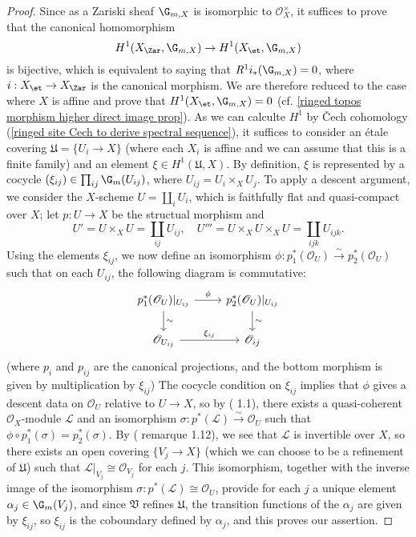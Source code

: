 \begin{proof}
Since as a Zariski sheaf $\G_{m,X}$ is isomorphic to $\mathscr{O}_X^\times$, it suffices to prove that the canonical homomorphism
\[H^1(X_\Zar,\G_{m,X})\to H^1(X_\et,\G_{m,X})\]
is bijective, which is equivalent to saying that $R^1i_*(\G_{m,X})=0$, where $i:X_\et\to X_\Zar$ is the canonical morphism. We are therefore reduced to the case where $X$ is affine and prove that $H^1(X_\et,\G_{m,X})=0$ (cf. \cref{ringed topos morphism higher direct image prop}). As we can calculte $H^1$ by \v{C}ech cohomology (\cref{ringed site Cech to derive spectral sequence}), it suffices to consider an \'etale covering $\mathfrak{U}=\{U_i\to X\}$ (where each $X_i$ is affine and we can assume that this is a finite family) and an element $\xi\in H^1(\mathfrak{U},X)$. By definition, $\xi$ is represented by a cocycle $(\xi_{ij})\in\prod_{ij}\G_m(U_{ij})$, where $U_{ij}=U_i\times_XU_j$. To apply a descent argument, we consider the $X$-scheme $U=\coprod_iU_i$, which is faithfully flat and quasi-compact over $X$; let $p:U\to X$ be the structual morphism and
\[U'=U\times_XU=\coprod_{ij}U_{ij},\quad U'''=U\times_XU\times_XU=\coprod_{ijk}U_{ijk}.\]
Using the elements $\xi_{ij}$, we now define an isomorphism $\phi:p_1^*(\mathscr{O}_U)\stackrel{\sim}{\to}p_2^*(\mathscr{O}_U)$ such that on each $U_{ij}$, the following diagram is commutative:
\[\begin{tikzcd}
p_1^*(\mathscr{O}_U)|_{U_{ij}}\ar[r,"\phi"]\ar[d,"\sim"]&p_2^*(\mathscr{O}_U)|_{U_{ij}}\ar[d,"\sim"]\\
\mathscr{O}_{U_{ij}}\ar[r,"\xi_{ij}"]&\mathscr{O}_{ij}
\end{tikzcd}\]
(where $p_i$ and $p_{ij}$ are the canonical projections, and the bottom morphism is given by multiplication by $\xi_{ij}$) The cocycle condition on $\xi_{ij}$ implies that $\phi$ gives a descent data on $\mathscr{O}_U$ relative to $U\to X$, so by (\cite{SGA1}  1.1), there exists a quasi-coherent $\mathscr{O}_X$-module $\mathscr{L}$ and an isomorphism $\sigma:p^*(\mathscr{L})\stackrel{\sim}{\to}\mathscr{O}_U$ such that $\phi\circ p_1^*(\sigma)=p_2^*(\sigma)$. By (\cite{SGA1}  remarque 1.12), we see that $\mathscr{L}$ is invertible over $X$, so there exists an open covering $\{V_j\to X\}$ (which we can choose to be a refinement of $\mathfrak{U}$) such that $\mathscr{L}|_{V_j}\cong\mathscr{O}_{V_j}$ for each $j$. This isomorphism, together with the inverse image of the isomorphism $\sigma:p^*(\mathscr{L})\cong\mathscr{O}_U$, provide for each $j$ a unique element $\alpha_j\in\G_m(V_j)$, and since $\mathfrak{V}$ refines $\mathfrak{U}$, the transition functions of the $\alpha_j$ are given by $\xi_{ij}$, so $\xi_{ij}$ is the coboundary defined by $\alpha_j$, and this proves our assertion.
\end{proof}

